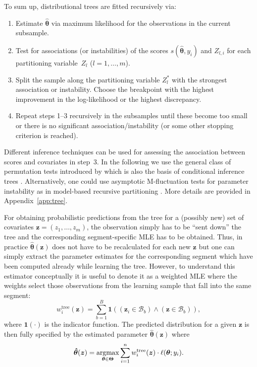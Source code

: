 \documentclass[aoas, preprint]{imsart}
\newcommand{\argmax}{\operatorname{argmax}\displaylimits}
\numberwithin{equation}{subsection}
\begin{document}
To sum up, distributional trees are fitted recursively via:
\begin{enumerate}
\item Estimate $\bm{\hat \theta}$ via maximum likelihood for the observations
  in the current subsample.
\item Test for associations (or instabilities) of the scores $s(\bm{\hat \theta}, y_i)$ 
  and $Z_{l,i}$ for each partitioning variable~$Z_l$ ($l = 1, \dots, m$).
\item Split the sample along the partitioning variable $Z_l^*$ with the
  strongest association or instability. Choose the breakpoint with the highest
  improvement in the log-likelihood or the highest discrepancy.
\item Repeat steps 1--3 recursively in the subsamples until these become too
  small or there is no significant association/instability (or some other
  stopping criterion is reached).
\end{enumerate}
%
Different inference techniques can be used for assessing the association between
scores and covariates in step~3. In the following we use the general class of
permutation tests introduced by \cite{Hothorn+Hornik+VanDeWiel:2006} which is
also the basis of conditional inference trees \citep[CTree,][]{Hothorn+Hornik+Zeileis:2006}.
Alternatively, one could use asymptotic M-fluctuation tests for parameter
instability \citep{Zeileis+Hornik:2007} as in model-based recursive partitioning
\citep[MOB,][]{Zeileis+Hothorn+Hornik:2008}. More details are provided in
Appendix~\ref{app:tree}.

For obtaining probabilistic predictions from the tree for a (possibly new) set
of covariates $\bm{z} = (z_1, \ldots, z_m)$, the observation simply has to
be ``sent down'' the tree and the corresponding segment-specific MLE has to be
obtained. Thus, in practice $\bm{\hat \theta}(\bm{z})$ does not have to be 
recalculated for each new $\bm{z}$ but one can simply extract the parameter estimates 
for the corresponding segment which have been computed already while
learning the tree. However, to understand this estimator conceptually it is useful
to denote it as a weighted MLE where the weights select those observations from 
the learning sample that fall into the same segment:
\begin{equation}
w^{\text{tree}}_i(\bm{z}) = \sum_{b=1}^B \mathbf{1}((\bm{z}_i \in \mathcal{B}_b) \land (\bm{z} \in \mathcal{B}_b)),
\end{equation}
where $\mathbf{1}(\cdot)$ is the indicator function. The predicted distribution
for a given $\bm{z}$ is then fully specified by the estimated parameter
$\bm{\hat \theta}(\bm{z})$ where
\begin{equation}
\bm{\hat \theta}(\bm{z}) = \argmax_{\bm{\theta} \in \bm{\Theta}} \sum_{i=1}^n w^{\text{tree}}_i(\bm{z}) \cdot \ell(\bm{\theta}; y_i).
\end{equation}
\end{document}
